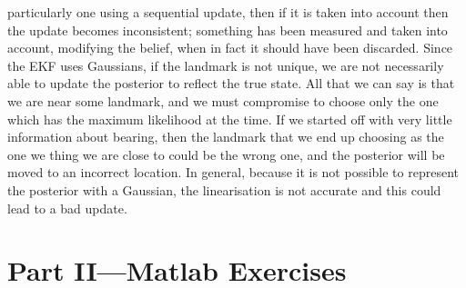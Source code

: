 \documentclass[a4paper,12pt]{article}
\begin{document}
\begin{enumerate}[resume]
  particularly one using a sequential update, then if it is taken into account
  then the update becomes inconsistent; something has been measured and taken
  into account, modifying the belief, when in fact it should have been
  discarded. Since the EKF uses Gaussians, if the landmark is not unique, we are
  not necessarily able to update the posterior to reflect the true state. All
  that we can say is that we are near some landmark, and we must compromise to
  choose only the one which has the maximum likelihood at the time. If we
  started off with very little information about bearing, then the landmark that
  we end up choosing as the one we thing we are close to could be the wrong one,
  and the posterior will be moved to an incorrect location. In general, because
  it is not possible to represent the posterior with a Gaussian, the
  linearisation is not accurate and this could lead to a bad update. 
\end{enumerate}
\section{Part II---Matlab Exercises}
\end{document}
